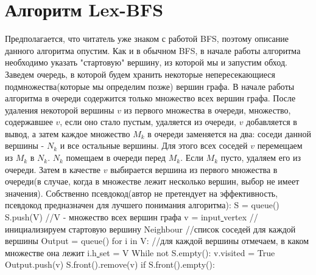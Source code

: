 \documentclass[a4paper,14pt]{article}
\begin{document}
\section{Алгоритм Lex-BFS}
	Предполагается, что читатель уже знаком с работой BFS, поэтому описание данного алгоритма опустим.
	\newline
	\newline Как и в обычном BFS, в начале работы алгоритма необходимо указать "стартовую" вершину, из которой мы и запустим обход.
	\newline Заведем очередь, в которой будем хранить некоторые непересекающиеся подмножества(которые мы определим позже) вершин графа.
	\newline В начале работы алгоритма в очереди содержится только множество всех вершин графа. После удаления некоторой вершины $v$ из первого множества в очереди, множество, содержавшее $v$, если оно стало пустым, удаляется из очереди, $v$ добавляется в вывод, а затем каждое множество $M_k$ в очереди заменяется на два: соседи данной вершины - $N_k$ и все остальные вершины. Для этого всех соседей $v$ перемещаем из $M_k$ в $N_k$. $N_k$ помещаем в очереди перед $M_k$. Если $M_k$ пусто, удаляем его из очереди. Затем в качестве $v$ выбирается вершина из первого множества в очереди(в случае, когда в множестве лежит несколько вершин, выбор не имеет значения).
	\newpage Собственно псевдокод(автор не претендует на эффективность, псевдокод предназначен для лучшего понимания алгоритма):
	\newline
	\newline \tab \tab S = queue()
	\newline \tab \tab S.push(V)  //V - множество всех вершин графа
	\newline \tab \tab v = input\underline{ }vertex  //инициализируем стартовую вершину 
	\newline \tab \tab Neighbour //список соседей для каждой вершины
	\newline \tab \tab Output = queue()
	\newline \tab \tab for i in V: //для каждой вершины отмечаем, в каком множестве она лежит
	\newline \tab \tab \quad i.h\underline{ }set = V 
	\newline \tab \tab While not S.empty():
	\newline \tab \tab \quad v.visited = True
	\newline \tab \tab \quad Output.push(v)
	\newline \tab \tab \quad S.front().remove(v)
	\newline \tab \tab \quad if S.front().empty():
\end{document}

